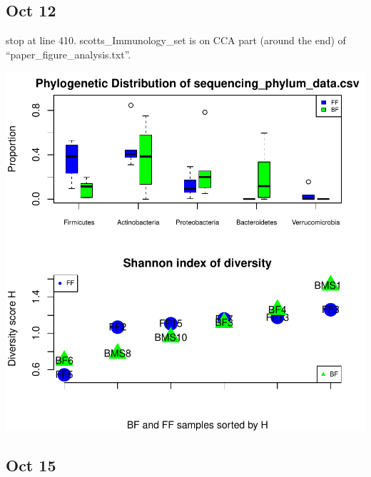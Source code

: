 \documentclass{article}\usepackage[]{graphicx}\usepackage[]{color}
\makeatletter
\def\maxwidth{ %
  \ifdim\Gin@nat@width>\linewidth
    \linewidth
  \else
    \Gin@nat@width
  \fi
}
\makeatother
\begin{document}
   
  \subsection{Oct 12}
stop at line 410.
scotts\_\ignorespaces Immunology\_\ignorespaces set is on CCA part (around the end) of ``paper\_\ignorespaces figure\_\ignorespaces analysis.txt''. 

  
\begin{Schunk}


{\centering \includegraphics[width=\maxwidth]{figure/Oct_12-1} 

}

\end{Schunk}

  \subsection{Oct 15}
  
\end{document}
